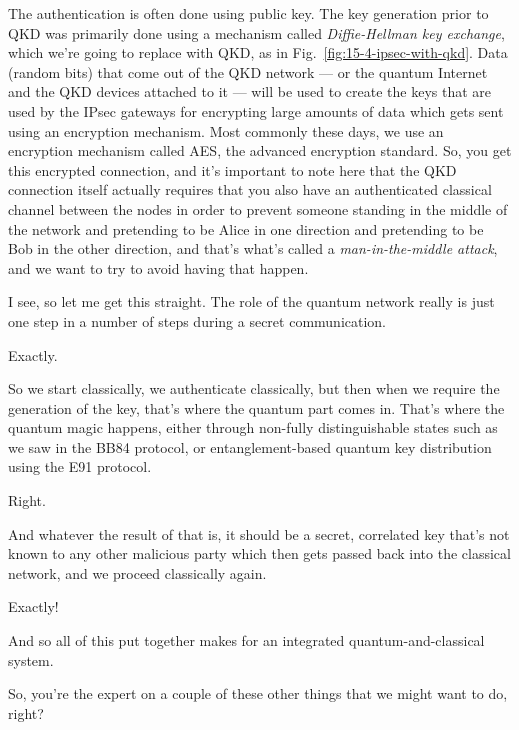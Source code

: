 \rrr The authentication is often done using public key. The key generation prior to QKD was primarily done using a mechanism called \emph{Diffie-Hellman key exchange}, which we're going to replace with QKD, as in Fig.~\ref{fig:15-4-ipsec-with-qkd}. Data (random bits) that come out of the QKD network --- or the quantum Internet and the QKD devices attached to it --- will be used to create the keys that are used by the IPsec gateways for encrypting large amounts of data which gets sent using an encryption mechanism. Most commonly these days, we use an encryption mechanism called AES, the advanced encryption standard. So, you get this encrypted connection, and it's important to note here that the QKD connection itself actually requires that you also have an authenticated classical channel between the nodes in order to prevent someone standing in the middle of the network and pretending to be Alice in one direction and pretending to be Bob in the other direction, and that's what's called a \emph{man-in-the-middle attack}, and we want to try to avoid having that happen.

\mmm I see, so let me get this straight. The role of the quantum network really is just one step in a number of steps during a secret communication.

\rrr Exactly.

\mmm So we start classically, we authenticate classically, but then when we require the generation of the key, that's where the quantum part comes in. That's where the quantum magic happens, either through non-fully distinguishable states such as we saw in the BB84 protocol, or entanglement-based quantum key distribution using the E91 protocol.

\rrr Right.

\mmm And whatever the result of that is, it should be a secret, correlated key that's not known to any other malicious party which then gets passed back into the classical network, and we proceed classically again.

\rrr Exactly!

And so all of this put together makes for an integrated quantum-and-classical system.

So, you're the expert on a couple of these other things that we might want to do, right?

